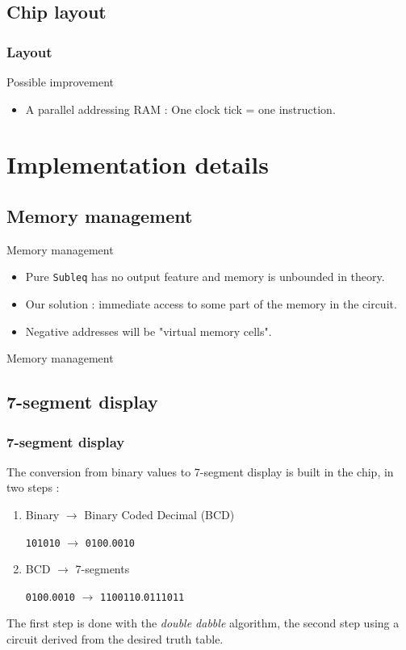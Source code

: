 \documentclass{beamer}
\begin{document}
\subsection{Chip layout}
\begin{frame}
    \frametitle{Layout}
    \centering
    
\end{frame}

\begin{frame}{Possible improvement}
  \begin{itemize}
    \item A parallel addressing RAM : One clock tick = one instruction.
  \end{itemize}
\end{frame}


\section{Implementation details}

\subsection{Memory management}

\begin{frame}{Memory management}
  \begin{itemize}
    \item Pure \texttt{Subleq} has no output feature and memory is
      unbounded in theory. %
    \item<2-> Our solution : immediate access to some part of the memory
      in the circuit.
    \item<3-> Negative addresses will be "virtual memory cells".
  \end{itemize}
\end{frame}

\begin{frame}{Memory management}
	\centering
	
\end{frame}

\subsection{7-segment display}

\begin{frame}
  \frametitle{7-segment display}
  The conversion from binary values to 7-segment display is built
  in the chip, in two steps :
  \begin{enumerate}
    \item<2-> Binary $\rightarrow$ Binary Coded Decimal (BCD)

          \texttt{101010} $\rightarrow$ \texttt{0100}.\texttt{0010}
    \item<3-> BCD $\rightarrow$ 7-segments

        \texttt{0100}.\texttt{0010} $\rightarrow$
        \texttt{1100110}.\texttt{0111011}
\end{enumerate}
The first step is done with the \emph{double dabble} algorithm,
the second step using a circuit derived from the desired truth table.

\end{frame}
\end{document}
